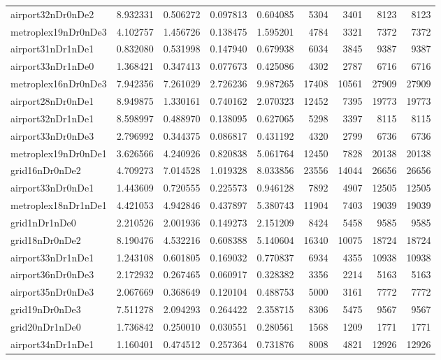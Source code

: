 \begin{longtable}{|l|r|r|r|r|r|r|r|r|}
airport32nDr0nDe2 & 8.932331 & 0.506272 & 0.097813 & 0.604085 & 5304 & 3401 & 8123 & 8123 \\
metroplex19nDr0nDe3 & 4.102757 & 1.456726 & 0.138475 & 1.595201 & 4784 & 3321 & 7372 & 7372 \\
airport31nDr1nDe1 & 0.832080 & 0.531998 & 0.147940 & 0.679938 & 6034 & 3845 & 9387 & 9387 \\
airport33nDr1nDe0 & 1.368421 & 0.347413 & 0.077673 & 0.425086 & 4302 & 2787 & 6716 & 6716 \\
metroplex16nDr0nDe3 & 7.942356 & 7.261029 & 2.726236 & 9.987265 & 17408 & 10561 & 27909 & 27909 \\
airport28nDr0nDe1 & 8.949875 & 1.330161 & 0.740162 & 2.070323 & 12452 & 7395 & 19773 & 19773 \\
airport32nDr1nDe1 & 8.598997 & 0.488970 & 0.138095 & 0.627065 & 5298 & 3397 & 8115 & 8115 \\
airport33nDr0nDe3 & 2.796992 & 0.344375 & 0.086817 & 0.431192 & 4320 & 2799 & 6736 & 6736 \\
metroplex19nDr0nDe1 & 3.626566 & 4.240926 & 0.820838 & 5.061764 & 12450 & 7828 & 20138 & 20138 \\
grid16nDr0nDe2 & 4.709273 & 7.014528 & 1.019328 & 8.033856 & 23556 & 14044 & 26656 & 26656 \\
airport33nDr0nDe1 & 1.443609 & 0.720555 & 0.225573 & 0.946128 & 7892 & 4907 & 12505 & 12505 \\
metroplex18nDr1nDe1 & 4.421053 & 4.942846 & 0.437897 & 5.380743 & 11904 & 7403 & 19039 & 19039 \\
grid1nDr1nDe0 & 2.210526 & 2.001936 & 0.149273 & 2.151209 & 8424 & 5458 & 9585 & 9585 \\
grid18nDr0nDe2 & 8.190476 & 4.532216 & 0.608388 & 5.140604 & 16340 & 10075 & 18724 & 18724 \\
airport33nDr1nDe1 & 1.243108 & 0.601805 & 0.169032 & 0.770837 & 6934 & 4355 & 10938 & 10938 \\
airport36nDr0nDe3 & 2.172932 & 0.267465 & 0.060917 & 0.328382 & 3356 & 2214 & 5163 & 5163 \\
airport35nDr0nDe3 & 2.067669 & 0.368649 & 0.120104 & 0.488753 & 5000 & 3161 & 7772 & 7772 \\
grid19nDr0nDe3 & 7.511278 & 2.094293 & 0.264422 & 2.358715 & 8306 & 5475 & 9567 & 9567 \\
grid20nDr1nDe0 & 1.736842 & 0.250010 & 0.030551 & 0.280561 & 1568 & 1209 & 1771 & 1771 \\
airport34nDr1nDe1 & 1.160401 & 0.474512 & 0.257364 & 0.731876 & 8008 & 4821 & 12926 & 12926 \\

\end{longtable}
